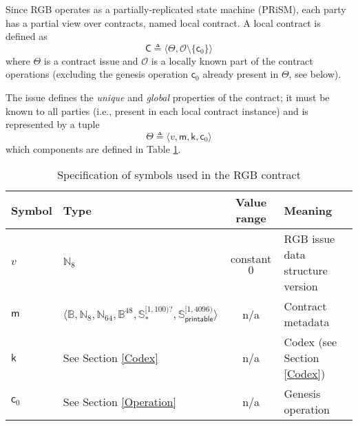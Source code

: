 \documentclass[9pt,oneside]{amsart}
\begin{document}
\begin{multicols}{2}
Since RGB operates as a partially-replicated state machine (PRiSM),
each party has a partial view over contracts, named \gls{local contract}.
A local contract is defined as
\noindent
\begin{equation}
\mathsf{C} \triangleq \langle \mathsf{\Theta}, \mathcal{O} \setminus \{ \mathsf{c}_0 \} \rangle
\end{equation}
\noindent
where $\Theta$ is a contract issue and
$\mathcal{O}$ is a locally known part of the contract operations
(excluding the genesis operation $\mathsf{c}_0$ already present in $\Theta$, see below).

The \gls{issue} defines the \emph{unique} and \emph{global} properties of the contract;
it must be known to all parties (i.e., present in each \gls{local contract} instance) and
is represented by a tuple
\noindent
\begin{equation}\label{eq:issue}
\mathsf{\Theta} \triangleq \langle v, \mathsf{m}, \mathsf{k}, \mathsf{c}_0 \rangle
\end{equation}
\noindent
which components are defined in Table \ref{tab:contract}.

\end{multicols}
\begin{table}[h]
\centering
\caption{Specification of symbols used in the RGB contract}\label{tab:contract}
\begin{tabular}{ l l c l }
\toprule
Symbol & Type & Value range & Meaning \\
\midrule
$v$ & $\mathbb{N}_8$ & constant $0$ & RGB issue data structure version \\
$\mathsf{m}$   & $\langle \mathbb{B}, \mathbb{N}_8, \mathbb{N}_{64}, \mathbb{B}^{48}, \mathbb{S}_*^{[1, 100)?}, \mathbb{S}_\mathsf{printable}^{[1, 4096)} \rangle$ & n/a & Contract metadata \\
$\mathsf{k}$   & See Section \ref{Codex} & n/a & Codex (see Section \ref{Codex}) \\
$\mathsf{c}_0$ & See Section \ref{Operation} & n/a & Genesis operation \\
\bottomrule
\end{tabular}
\end{table}
\end{document}

